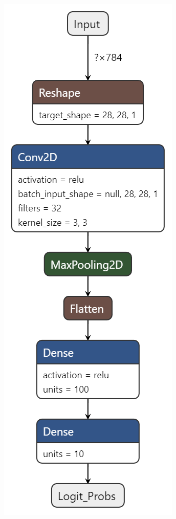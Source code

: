 \documentclass[11pt]{article}
\begin{document}
\begin{figure}[H]
\begin{subfigure}[c]{0.24\textwidth}
        \caption{}
        \label{fig:DNN6}
    \end{subfigure}
    \centering
    \begin{subfigure}[c]{0.24\textwidth}
        \centering
        \includegraphics[width = \textwidth]{conv1.png}

\end{subfigure}
\end{figure}
\end{document}
